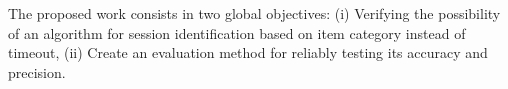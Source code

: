 \documentclass[ecp,tc,english]{iiufrgs}
\begin{document}









The proposed work consists in two global objectives: (i) Verifying the possibility of an algorithm for session identification based on item category instead of timeout, 
(ii) Create an evaluation method for reliably testing its accuracy and precision.
\end{document}
